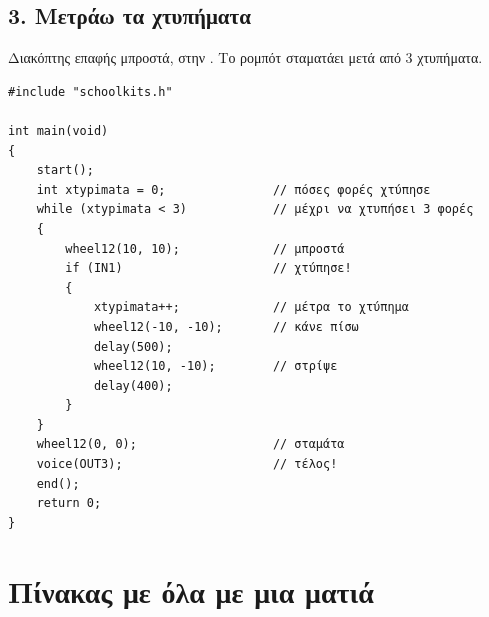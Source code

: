 \documentclass[11pt,a4paper]{article}
\newcommand{\code}[1]{\texttt{\detokenize{#1}}}
\begin{document}
\subsection*{3. Μετράω τα χτυπήματα}
Διακόπτης επαφής μπροστά, στην \code{IN1}. Το ρομπότ σταματάει μετά από 3 χτυπήματα.
\begin{lstlisting}
#include "schoolkits.h"

int main(void)
{
    start();
    int xtypimata = 0;               // πόσες φορές χτύπησε
    while (xtypimata < 3)            // μέχρι να χτυπήσει 3 φορές
    {
        wheel12(10, 10);             // μπροστά
        if (IN1)                     // χτύπησε!
        {
            xtypimata++;             // μέτρα το χτύπημα
            wheel12(-10, -10);       // κάνε πίσω
            delay(500);
            wheel12(10, -10);        // στρίψε
            delay(400);
        }
    }
    wheel12(0, 0);                   // σταμάτα
    voice(OUT3);                     // τέλος!
    end();
    return 0;
}
\end{lstlisting}

\section{Πίνακας με όλα με μια ματιά}
\end{document}
